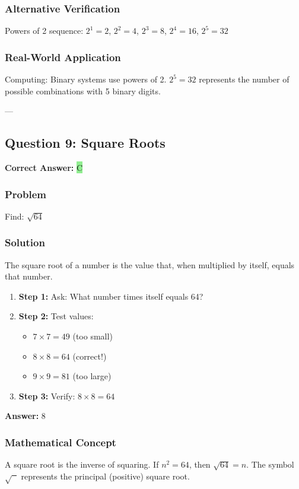 \documentclass[12pt]{article}
\begin{document}
\subsubsection*{Alternative Verification}
Powers of 2 sequence: $2^1=2$, $2^2=4$, $2^3=8$, $2^4=16$, $2^5=32$ 

\subsubsection*{Real-World Application}
Computing: Binary systems use powers of 2. $2^5 = 32$ represents the number of possible combinations with 5 binary digits.

---

\subsection{Question 9: Square Roots}

\textbf{Correct Answer: } \colorbox{lightgreen}{C}

\subsubsection*{Problem}
Find: $\sqrt{64}$

\subsubsection*{Solution}

The square root of a number is the value that, when multiplied by itself, equals that number.

\begin{enumerate}
\item \textbf{Step 1:} Ask: What number times itself equals 64?
\item \textbf{Step 2:} Test values:
  \begin{itemize}
  \item $7 \times 7 = 49$ (too small)
  \item $8 \times 8 = 64$ (correct!)
  \item $9 \times 9 = 81$ (too large)
  \end{itemize}
\item \textbf{Step 3:} Verify: $8 \times 8 = 64$ 
\end{enumerate}

\textbf{Answer: } $8$

\subsubsection*{Mathematical Concept}
A square root is the inverse of squaring. If $n^2 = 64$, then $\sqrt{64} = n$. The symbol $\sqrt{\phantom{x}}$ represents the principal (positive) square root.
\end{document}
